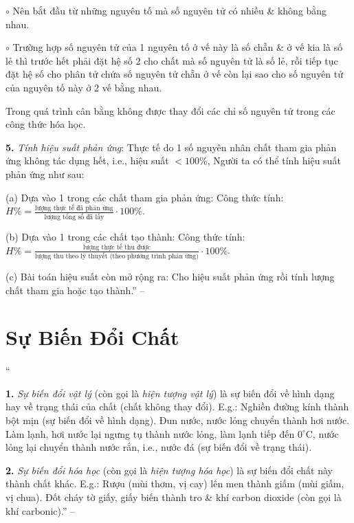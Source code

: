 \documentclass{article}
\numberwithin{equation}{section}
\begin{document}
\begin{enumerate*}
\begin{enumerate*}
\begin{enumerate*}
			\item[$\circ$] Nên bắt đầu từ những nguyên tố mà số nguyên tử có nhiều \& không bằng nhau.
			\item[$\circ$] Trường hợp số nguyên tử của 1 nguyên tố ở vế này là số chẵn \& ở vế kia là số lẻ thì trước hết phải đặt hệ số $2$ cho chất mà số nguyên tử là số lẻ, rồi tiếp tục đặt hệ số cho phân tử chứa số nguyên tử chẵn ở vế còn lại sao cho số nguyên tử của nguyên tố này ở 2 vế bằng nhau.
		\end{enumerate*}
	\end{enumerate*}
	Trong quá trình cân bằng không được thay đổi các chỉ số nguyên tử trong các công thức hóa học.
	\item[\textbf{5.}] \textit{Tính hiệu suất phản ứng}: Thực tế do 1 số nguyên nhân chất tham gia phản ứng không tác dụng hết, i.e., hiệu suất $< 100$\%, Người ta có thể tính hiệu suất phản ứng như sau:
	\begin{enumerate*}
		\item[(a)] Dựa vào 1 trong các chất tham gia phản ứng: Công thức tính: $H\% = \frac{\mbox{lượng thực tế đã phản ứng}}{\mbox{lượng tổng số đã lấy}}\cdot100\%$.
		\item[(b)] Dựa vào 1 trong các chất tạo thành: Công thức tính: $H\% = \frac{\mbox{lượng thực tế thu được}}{\mbox{lượng thu theo lý thuyết (theo phương trình phản ứng)}}\cdot100\%$.
		\item[(c)] Bài toán hiệu suất còn mở rộng ra: Cho hiệu suất phản ứng rồi tính lượng chất tham gia hoặc tạo thành.'' -- \cite[Chap. 2, pp. 44--46]{An_400_BT_Hoa_Hoc_8_2020}
	\end{enumerate*}
\end{enumerate*}

\section{Sự Biến Đổi Chất}
``\begin{enumerate*}
	\item[\textbf{1.}] \textit{Sự biến đổi vật lý} (còn gọi là \textit{hiện tượng vật lý}) là sự biến đổi về hình dạng hay về trạng thái của chất (chất không thay đổi). E.g.: Nghiền đường kính thành bột mịn (sự biến đổi về hình dạng). Đun nước, nước lỏng chuyển thành hơi nước. Làm lạnh, hơi nước lại ngưng tụ thành nước lỏng, làm lạnh tiếp đến $0^\circ$C, nước lỏng lại chuyển thành nước rắn, i.e., nước đá (sự biến đổi về trạng thái).
	\item[\textbf{2.}] \textit{Sự biến đổi hóa học} (còn gọi là \textit{hiện tượng hóa học}) là sự biến đổi chất này thành chất khác. E.g.: Rượu (mùi thơm, vị cay) lên men thành giấm (mùi giấm, vị chua). Đốt cháy tờ giấy, giấy biến thành tro \& khí carbon dioxide  (còn gọi là khí carbonic).'' -- \cite[Chap. 2, p. 32]{Truong2021}
\end{enumerate*}
\end{document}
